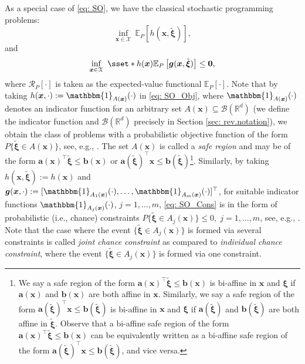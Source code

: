 \documentclass[final,onefignum,onetabnum]{class}
\newcommand{\ee}[2]{\mathbb{E}_{#1} \left[ #2 \right]}
\newcommand{\rrisk}[2]{\Cs{R}_{#1} \left[ #2 \right]}
\newcommand{\bs}[1]{\boldsymbol{#1}} %
\newcommand{\Bs}[1]{\mathbb{#1}} %
\newcommand{\Cs}[1]{\mathcal{#1}} %
\newcommand{\txi}{\tilde{\bs{\xi}}}
\begin{document}
As a special case of \eqref{eq: SO}, we have the classical stochastic programming problems:
\begin{equation}
	\label{eq: SO_Obj}
	\inf_{\bs{x} \in \Cs{X} } \ \ee{P}{h(\bs{x},\txi)}, %
\end{equation}
and
\begin{equation}
	\label{eq: SO_Cons}
	\inf_{\bs{x} \in \Cs{X} } \ \sset*{h(\bs{x})}{\ee{P}{\bs{g}(\bs{x},\txi)} \le \bs{0}}, %
\end{equation} 
where $\rrisk{P}{\cdot}$ is taken as the expected-value functional $\ee{P}{\cdot}$.  
Note that by taking $h(\bs{x}, \cdot):=\mathbbm{1}_{A(\bs{x})} (\cdot)$ in \eqref{eq: SO_Obj}, where $\mathbbm{1}_{A(\bs{x})} (\cdot)$ denotes an indicator function for an arbitrary set $A(\bs{x}) \subseteq \Cs{B}(\Bs{R}^{d})$ (we define the indicator function and $\Cs{B}(\Bs{R}^{d})$ precisely in Section \ref{sec: rev.notation}), we obtain  the class of problems with a probabilistic objective function of the form  $P\{ \txi \in A(\bs{x})\}$, see, e.g., \citet{prekopa2003probabilistic}. The set  $A(\bs{x})$ is called a {\it safe region} and may be of the form $\bs{a}(\bs{x})^{\top} \txi \le \bs{b}(\bs{x})$ or $\bs{a}(\txi)^{\top} \bs{x} \le \bs{b}(\txi)$\footnote{We  say  a safe region of the form $\bs{a}(\bs{x})^{\top} \txi \le \bs{b}(\bs{x})$ is bi-affine in $\bs{x}$ and $\bs{\xi}$ if $\bs{a}(\bs{x}) $ and $\bs{b}(\bs{x})$ are both affine in $\bs{x}$. Similarly, we say a safe region of the  form  $\bs{a}(\txi)^{\top} \bs{x} \le \bs{b}(\txi)$ is bi-affine in $\bs{x}$ and $\bs{\xi}$ if $\bs{a}(\txi)$ and $\bs{b}(\txi)$ are both affine in $\txi$. Observe that a bi-affine safe region of the form  $\bs{a}(\bs{x})^{\top} \txi \le \bs{b}(\bs{x})$ can be equivalently written as a bi-affine safe region of the form  $\bs{a}(\txi)^{\top} \bs{x} \le \bs{b}(\txi)$, and vice versa.}. Similarly, by taking $h(\bs{x},\txi):=h(\bs{x})$ and $\bs{g}(\bs{x}, \cdot):=[\mathbbm{1}_{A_{1}(\bs{x})} (\cdot), \ldots, \mathbbm{1}_{A_{m}(\bs{x})} (\cdot)]^{\top}$,  for  suitable indicator functions $\mathbbm{1}_{A_{j}(\bs{x})} (\cdot)$, $j=1, \ldots, m$, \eqref{eq: SO_Cons}  is in the form of probabilistic (i.e., chance) constraints $P\{ \txi \in A_{j}(\bs{x})\}  \le 0, \; j=1, \ldots, m$, see, e.g., \citet{charnes1958chance,charnes1959chance,prekopa1970probabilistic,prekopa1974,dentcheva2006probabilistic}. Note that the case where the event $\{\txi \in A_{j}(\bs{x})\}$ is formed via  several constraints is called {\it joint chance constraint} as compared to {\it individual chance constraint}, where the event  $\{\txi \in A_{j}(\bs{x})\}$ is formed via  one constraint. 
\end{document}
